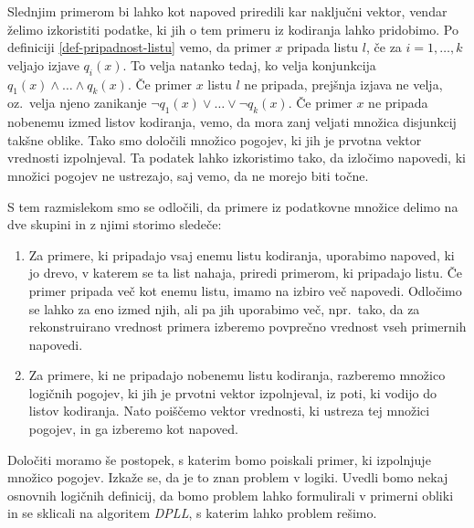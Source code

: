 \documentclass[12pt,a4paper]{article}
\begin{document}
Slednjim primerom bi lahko kot napoved priredili kar naključni vektor, vendar želimo izkoristiti podatke, ki jih o tem primeru iz kodiranja lahko pridobimo.
Po definiciji \ref{def-pripadnost-listu} vemo, da primer $x$ pripada listu $l$, če za $i=1,\ldots,k$ veljajo izjave $q_i(x)$. 
To velja natanko tedaj, ko velja konjunkcija $q_1(x)\land \ldots \land q_k(x)$. 
Če primer $x$ listu $l$ ne pripada, prejšnja izjava ne velja, oz.~velja njeno zanikanje $\lnot q_1(x) \lor \ldots \lor \lnot q_k(x)$.
Če primer $x$ ne pripada nobenemu izmed listov kodiranja, vemo, da mora zanj veljati množica disjunkcij takšne oblike.
Tako smo določili množico pogojev, ki jih je prvotna vektor vrednosti izpolnjeval.
Ta podatek lahko izkoristimo tako, da izločimo napovedi, ki množici pogojev ne ustrezajo, saj vemo, da ne morejo biti točne.

S tem razmislekom smo se odločili, da primere iz podatkovne množice delimo na dve skupini in z njimi storimo sledeče:
\begin{enumerate}
	\item Za primere, ki pripadajo vsaj enemu listu kodiranja, 
	uporabimo napoved, ki jo drevo, v katerem se ta list nahaja, priredi primerom, ki pripadajo listu.
	Če primer pripada več kot enemu listu, imamo na izbiro več napovedi.
	Odločimo se lahko za eno izmed njih, ali pa jih uporabimo več, npr.\ 
	tako, da za rekonstruirano vrednost primera izberemo povprečno vrednost vseh primernih napovedi.

	\item Za primere, ki ne pripadajo nobenemu listu kodiranja, 
	razberemo množico logičnih pogojev, ki jih je prvotni vektor izpolnjeval, iz poti, ki vodijo do listov kodiranja.
	Nato poiščemo vektor vrednosti, ki ustreza tej množici pogojev, in ga izberemo kot napoved.
\end{enumerate}

Določiti moramo še postopek, s katerim bomo poiskali primer, ki izpolnjuje množico pogojev.
Izkaže se, da je to znan problem v logiki. Uvedli bomo nekaj osnovnih logičnih definicij, 
da bomo problem lahko formulirali v primerni obliki in se sklicali na algoritem \emph{DPLL}, s katerim lahko problem rešimo.

\end{document}
